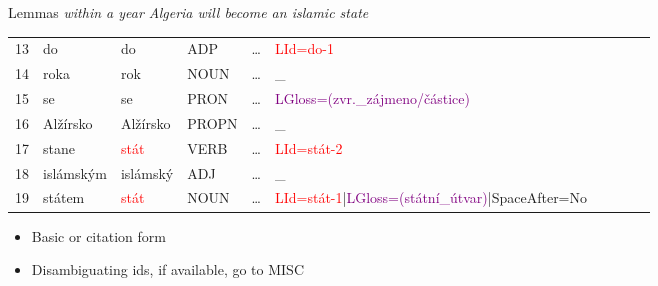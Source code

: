 \documentclass[10pt, compress, aspectratio=169]{beamer}
\begin{document}
\begin{frame}{Lemmas}
\textit{within a year Algeria will become an islamic state}

\begin{tabular}{llllllllll}
13 & do & do & ADP & \dots & \textcolor{red}{LId=do-1} \\
14 & roka & rok & NOUN & \dots & \_ \\
15 & se & se & PRON & \dots & \textcolor{purple}{LGloss=(zvr.\_zájmeno/částice)} \\
16 & Alžírsko & Alžírsko & PROPN & \dots & \_ \\
17 & stane & \textcolor{red}{stát} & VERB & \dots & \textcolor{red}{LId=stát-2} \\
18 & islámským & islámský & ADJ & \dots & \_ \\
19 & státem & \textcolor{red}{stát} & NOUN & \dots & \textcolor{red}{LId=stát-1}|\textcolor{purple}{LGloss=(státní\_útvar)}|SpaceAfter=No \\
\end{tabular}
\bigskip
\begin{itemize}
\item Basic or citation form
\item Disambiguating ids, if available, go to MISC
\end{itemize}
\end{frame}
\end{document}
